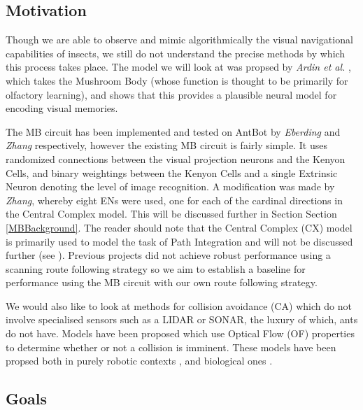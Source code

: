 \documentclass[a4paper,12pt,twoside,openright]{article}
\begin{document}
\subsection{ Motivation }
Though we are able to observe and mimic algorithmically the visual navigational capabilities
of insects, we still do not understand the precise methods by which this process takes place. The
model we will look at was propsed by \textit{Ardin et al.} \cite{Ardin2016}, which takes
the Mushroom Body (whose function is thought to be primarily for olfactory learning), and shows
that this provides a plausible neural model for encoding visual memories.
\newline

The MB circuit has been implemented and tested on AntBot by \textit{Eberding} and \textit{Zhang} respectively, however
the existing MB circuit is fairly simple. It uses randomized connections between
the visual projection neurons and the Kenyon Cells, and binary weightings between the Kenyon Cells
and a single Extrinsic Neuron denoting the level of
image recognition. A modification was made by \textit{Zhang}, whereby eight ENs were used, one for each of
the cardinal directions in the Central Complex model. This will be discussed further in Section
Section
\ref{MBBackground}. The reader should note that the Central Complex (CX) model is primarily used
to model the task of Path Integration and will not be discussed further (see \cite{Scimeca2017}).
Previous projects did not achieve robust performance using a scanning route following strategy so we
aim to establish a baseline for performance using the MB circuit with our own route following strategy.
\newline

We would also like to look at methods for collision avoidance (CA) which do not involve specialised
sensors such as a LIDAR or SONAR, the luxury of which, ants do not have. Models have been proposed
which use Optical Flow (OF) properties to determine whether or not a collision is imminent. These
models have been propsed both in purely robotic contexts \cite{Souhila2007},
and biological ones \cite{Low2005}. 
  
\subsection { Goals }
\end{document}
